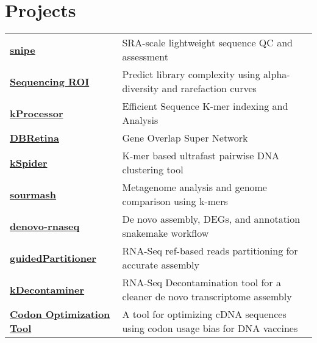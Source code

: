 \documentclass[letterpaper,11pt]{article}
\begin{document}
\section{Projects}
\noindent
\begin{tabular}{@{}p{} p{}}
  \textbf{\href{https://snipe-bio.github.io/}{snipe}} & SRA-scale lightweight sequence QC and assessment  \\
  \textbf{\href{https://snipe-bio.github.io/}{Sequencing ROI}} & Predict library complexity using alpha-diversity and rarefaction curves  \\
  \textbf{\href{https://github.com/dib-lab/kProcessor}{kProcessor}} & Efficient Sequence K-mer indexing and Analysis \\
  \textbf{\href{https://dbretina.github.io/DBRetina/}{DBRetina}} & Gene Overlap Super Network \\
  \textbf{\href{https://github.com/dib-lab/kSpider}{kSpider}} & K-mer based ultrafast pairwise DNA clustering tool \\
  \textbf{\href{https://github.com/sourmash-bio/sourmash}{sourmash}}  & Metagenome analysis and genome comparison using k-mers \\
  \textbf{\href{https://github.com/mr-eyes/denovo-rnaseq}{denovo-rnaseq}} & De novo assembly, DEGs, and annotation snakemake workflow \\
  \textbf{\href{https://github.com/mr-eyes/guidedPartitioner}{guidedPartitioner}} & RNA-Seq ref-based reads partitioning for accurate assembly \\
  \textbf{\href{https://github.com/mr-eyes/kDecontaminer}{kDecontaminer}} & RNA-Seq Decontamination tool for a cleaner de novo transcriptome assembly \\
  \textbf{\href{https://github.com/mr-eyes/codons-optimizer}{Codon Optimization Tool}} & A tool for optimizing cDNA sequences using codon usage bias for DNA vaccines \\
\end{tabular}
\end{document}
